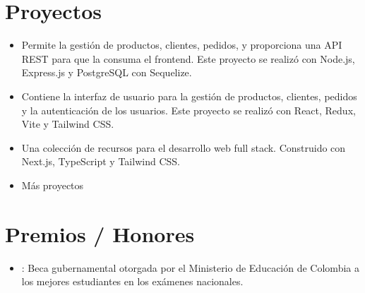 \documentclass[]{rahulworld-resume}
\begin{document}
\begin{minipage}[t]{0.66\textwidth}
    \section{Proyectos}

    \begin{itemize}
        \item
              \href{https://github.com/Ide-Pinturerias/pinturas-app-back}{} Permite la gestión de productos, clientes,
              pedidos, y proporciona una API REST para que la consuma el frontend. Este
              proyecto se realizó con Node.js, Express.js y PostgreSQL con Sequelize.

        \item
              \href{https://pinturas-app-front.vercel.app/}
              {} Contiene la interfaz
              de usuario para la gestión de productos, clientes, pedidos y
              la autenticación de los usuarios. Este proyecto se realizó con
              React, Redux, Vite y Tailwind CSS.



        \item \href{https://resources-app.vercel.app/}{} Una colección de recursos para el desarrollo web full stack. Construido con
              Next.js, TypeScript y Tailwind CSS.

        \item Más proyectos
              \href{https://jamerrq-com.vercel.app/projects}{}

    \end{itemize}

    \section{Premios / Honores}

    \begin{itemize}
        \item {}: Beca gubernamental otorgada por el
              Ministerio de Educación de Colombia a los mejores estudiantes en los exámenes nacionales.
    \end{itemize}
\end{minipage}
\end{document}
